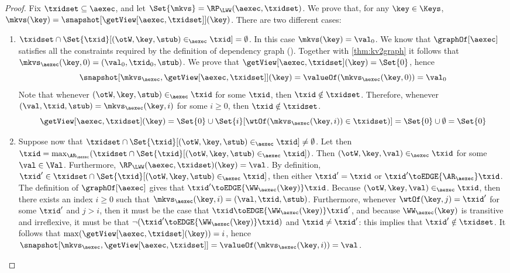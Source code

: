 \begin{proof}
Fix \(\txidset \subseteq \aexec\), and let \(\Set{\mkvs} = \RP_{\LWW}(\aexec, \txidset)\). We prove that, for any \(\key \in \Keys\), 
\(\mkvs(\key) = \snapshot[\getView[\aexec, \txidset]](\key)\). There are two different cases: 
\begin{enumerate}
    \item \(\txidset \cap \Set{ \txid }[ (\otW, \key, \stub) \in_{\aexec} \txid ] = \emptyset\). 
In this case \(\mkvs(\key) = \val_0\). 
We know that \(\graphOf[\aexec]\) satisfies all the constraints required by the definition of dependency graph 
(\cite{laws}). Together with \cref{thm:kv2graph} it follows that \(\mkvs_{\aexec}(\key, 0) = (\val_0, \txid_0, \stub)\).
We prove that \(\getView[\aexec, \txidset](\key) = \Set{0}\), 
hence 
\[ 
\snapshot[\mkvs_{\aexec}, \getView[\aexec, \txidset]](\key) = \valueOf(\mkvs_{\aexec}(\key, 0)) = \val_{0}
\]
Note that whenever \((\otW, \key, \stub) \in_{\aexec} \txid\) for some \(\txid\), then 
\(\txid \notin \txidset\). Therefore, whenever \((\val, \txid, \stub) = \mkvs_{\aexec}(\key, i)\) for some \(i \geq 0\), then 
\(\txid \notin \txidset\).
\[
\getView[\aexec, \txidset](\key) = \Set{0} \cup \Set{i }[ \wtOf(\mkvs_{\aexec}(\key, i)) \in \txidset)] = \Set{0} \cup \emptyset = \Set{0}
\]
\item Suppose now that \(\txidset \cap \Set{ \txid }[ (\otW, \key, \stub) \in_{\aexec} \txid ] \neq \emptyset\). 
Let then \(\txid = \max_{\AR_{\aexec}}(\txidset \cap \Set{\txid }[ (\otW, \key, \stub) \in_{\aexec} \txid])\). 
Then \((\otW, \key, \val) \in_{\aexec} \txid\) for some \(\val \in \Val\). Furthermore, \(\RP_{\LWW}(\aexec, \txidset)(\key) = \val\).
By definition, \(\txid' \in \txidset \cap \Set{ \txid }[ (\otW, \key, \stub) \in_{\aexec} \txid]\), 
then either \(\txid' = \txid\) or \(\txid' \toEDGE{\AR_{\aexec}} \txid\). The definition of 
\(\graphOf[\aexec]\) gives that \(\txid' \toEDGE{\WW_{\aexec}(\key)} \txid\). 
Because \((\otW, \key, \val) \in_{\aexec} \txid\), then there exists an index 
\(i \geq 0\) such that \(\mkvs_{\aexec}(\key, i) = (\val, \txid, \stub)\). Furthermore, 
whenever \(\wtOf(\key, j) = \txid'\) for some \(\txid'\) and \(j > i\), then it must 
be the case that \(\txid \toEDGE{\WW_{\aexec}(\key)} \txid'\), and because 
\(\WW_{\aexec}(\key)\) is transitive and irreflexive, it must be that  
\(\neg( \txid' \toEDGE{\WW_{\aexec}(\key)} \txid)\) and \(\txid \neq \txid'\): this implies that 
\(\txid' \notin \txidset\). It follows that \(\max(\getView[\aexec, \txidset](\key)) = i\), hence 
\(\snapshot[\mkvs_{\aexec}, \getView[\aexec, \txidset]] = \valueOf(\mkvs_{\aexec}(\key, i)) = \val\).
\end{enumerate}
\end{proof}

